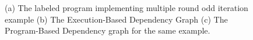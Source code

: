 \begin{example}
{\begin{figure}
\begin{subfigure}{.38\textwidth}
\begin{centering}
\begin{tikzpicture}[scale=\textwidth/12cm,samples=200]
     \end{tikzpicture}
     \caption{}
        \end{centering}
        \end{subfigure}
        \vspace{-0.3cm}
\caption{(a) The labeled program implementing multiple round odd iteration example 
(b) The Execution-Based Dependency Graph
(c) The Program-Based Dependency graph for the same example.}
    \label{fig:overappr_example}
    \vspace{-0.5cm}
\end{figure}
}
%
\end{example}

